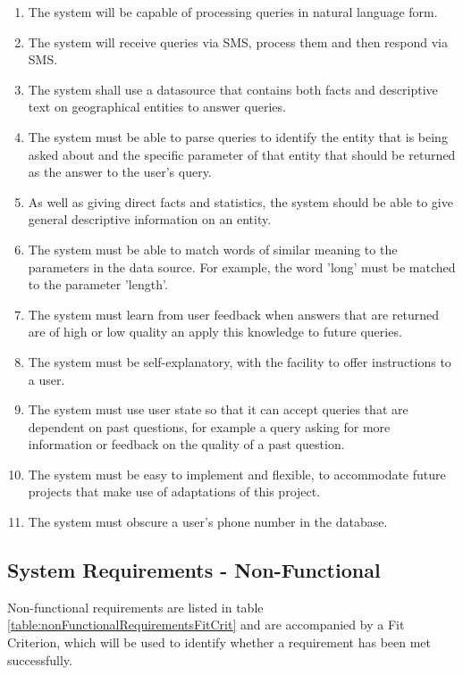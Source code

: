 \documentclass[authoryearcitations]{UoYCSproject}
\begin{document}
\begin{enumerate}
  \item \label{requirement:sysReqNaturalLanguage} The system will be capable of processing queries in natural language form.
  \item The system will receive queries via SMS, process them and then respond via SMS.
  \item The system shall use a datasource that contains both facts and descriptive text on geographical entities to answer queries.
  \item The system must be able to parse queries to identify the entity that is being asked about and the specific parameter of that entity that should be returned as the answer to the user's query.
  \item As well as giving direct facts and statistics, the system should be able to give general descriptive information on an entity.
  \item The system must be able to match words of similar meaning to the parameters in the data source.  For example, the word 'long' must be matched to the parameter 'length'.
  \item The system must learn from user feedback when answers that are returned are of high or low quality an apply this knowledge to future queries.
  \item The system must be self-explanatory, with the facility to offer instructions to a user.
  \item The system must use user state so that it can accept queries that are dependent on past questions, for example a query asking for more information or feedback on the quality of a past question.
  \item \label{requirement:easyToImplement} The system must be easy to implement and flexible, to accommodate future projects that make use of adaptations of this project.
  \item The system must obscure a user's phone number in the database.
\end{enumerate}

\subsection{System Requirements - Non-Functional}
\label{subsubsec:systemRequirementsNonFunctional}
Non-functional requirements are listed in table \ref{table:nonFunctionalRequirementsFitCrit} and are accompanied by a Fit Criterion, which will be used to identify whether a requirement has been met successfully.
\end{document}
